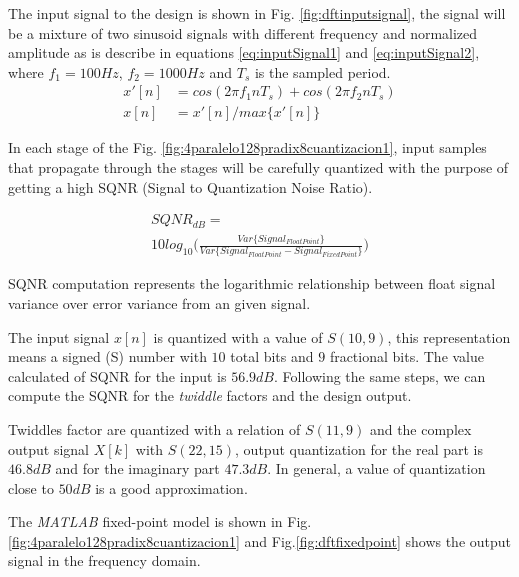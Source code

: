 \documentclass[10pt,times,mathptm,psfig,final,journal,comsoc]{IEEEtran}
\begin{document}
The input signal to the design is shown in Fig. \ref{fig:dftinputsignal}, the signal  will be a mixture of two sinusoid signals with different frequency and normalized amplitude as is describe in equations \ref{eq:inputSignal1} and \ref{eq:inputSignal2}, where $f_1=100Hz$, $f_2=1000Hz$ and $T_s$ is the sampled period.
\begin{align}
x'[n] &= cos(2\pi f_1 n T_s) + cos(2\pi f_2 n T_s)\label{eq:inputSignal1}  \\
x[n] &= x'[n]/max\{x'[n]\} \label{eq:inputSignal2}						
\end{align}


In each stage of the Fig. \ref{fig:4paralelo128pradix8cuantizacion1}, input samples that propagate  through the stages will be carefully quantized with the purpose of getting a high SQNR (Signal to Quantization Noise Ratio).

\begin{equation}\label{eq:sqnr}
  \begin{multlined}
SQNR_{dB} =\\
10log_{10} \bigg(  \frac{  Var\{Signal_{FloatPoint}\}  }{  Var\{Signal_{FloatPoint} - Signal_{FixedPoint}\}}  \bigg)
 \end{multlined}
\end{equation}


SQNR computation represents the logarithmic relationship between float signal variance over error variance from an given signal.

The input signal $x[n]$ is quantized with a value of $S(10,9)$, this representation means a signed (S) number with $10$ total bits and $9$ fractional bits. The value calculated of SQNR for the input is $56.9dB$. Following the same steps, we can compute the SQNR for the \textit{twiddle} factors and the design output.

Twiddles factor are quantized with a relation of $S(11,9)$ and the complex output signal $X[k]$ with $S(22,15)$, output quantization for the real part is $46.8dB$ and for the imaginary part $47.3dB$. In general, a value of quantization close to $50dB$ is a good approximation.


The \textit{MATLAB} fixed-point model is shown in Fig. \ref{fig:4paralelo128pradix8cuantizacion1} and  Fig.\ref{fig:dftfixedpoint} shows the output signal in the frequency domain.
\end{document}
